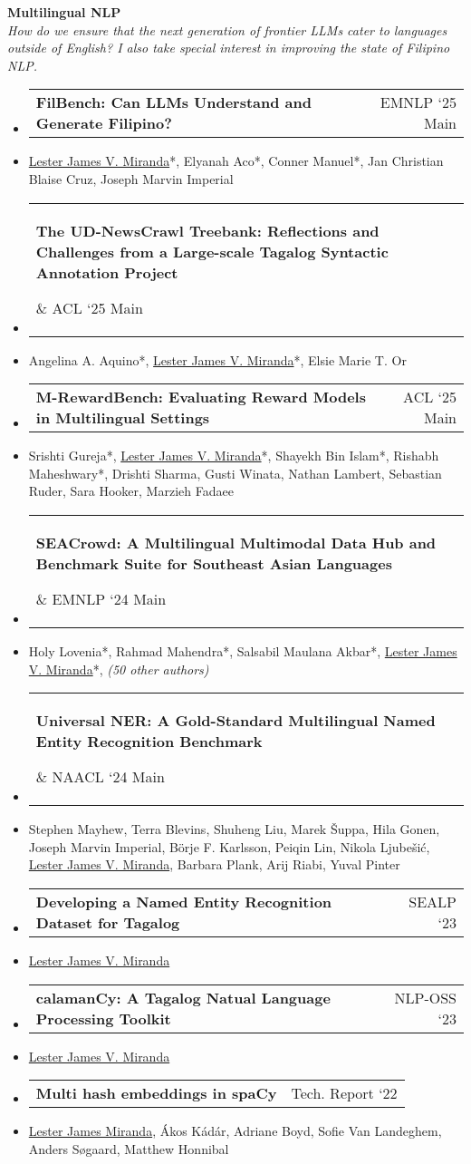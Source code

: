 \documentclass[a4paper,11pt]{article}
\makeatletter
\newcommand{\resumeItem}[1]{
  \item\small{
    {#1 \vspace{-2pt}}
  }
}
\newcommand{\resumeProjectHeading}[2]{
    \item
    \begin{tabular*}{0.97\textwidth}{l@{\extracolsep{\fill}}r}
      \small#1 & #2 \\
    \end{tabular*}\vspace{-7pt}
}
\newcommand{\resumeSubHeadingListStart}{\begin{itemize}[leftmargin=0.15in, label={}]}
\newcommand{\resumeSubHeadingListEnd}{\end{itemize}}
\makeatother
\begin{document}
\vspace{0.1em}
\textbf{Multilingual NLP}\\
\textit{How do we ensure that the next generation of frontier LLMs cater to languages outside of English? I also take special interest in improving the state of Filipino NLP.}
\resumeSubHeadingListStart
\resumeProjectHeading
{\textbf{FilBench: Can LLMs Understand and Generate Filipino?}}{\small EMNLP `25 Main}
\resumeItem{\underline{Lester James V. Miranda}*, Elyanah Aco*, Conner Manuel*, Jan Christian Blaise Cruz, Joseph Marvin Imperial}
\resumeProjectHeading
{\parbox{0.80\textwidth}{\textbf{The UD-NewsCrawl Treebank: Reflections and Challenges from a Large-scale Tagalog Syntactic Annotation Project}}}{\small ACL `25 Main}
\resumeItem{Angelina A. Aquino*, \underline{Lester James V. Miranda}*, Elsie Marie T. Or}
\resumeProjectHeading
{\textbf{M-RewardBench: Evaluating Reward Models in Multilingual Settings}}{\small ACL `25 Main}
\resumeItem{Srishti Gureja*, \underline{Lester James V. Miranda}*, Shayekh Bin Islam*, Rishabh Maheshwary*, Drishti Sharma, Gusti Winata, Nathan Lambert, Sebastian Ruder, Sara Hooker, Marzieh Fadaee}
\resumeProjectHeading
{\parbox{0.80\textwidth}{\textbf{SEACrowd: A Multilingual Multimodal Data Hub and Benchmark Suite for Southeast Asian Languages}}}{\small EMNLP `24 Main}
\resumeItem{Holy Lovenia*, Rahmad Mahendra*, Salsabil Maulana Akbar*, \underline{Lester James V. Miranda}*, \textit{(50 other authors)}}
\resumeProjectHeading
{\parbox{0.70\textwidth}{\textbf{Universal NER: A Gold-Standard Multilingual Named Entity Recognition Benchmark}}}{\small NAACL `24 Main}
\resumeItem{Stephen Mayhew, Terra Blevins, Shuheng Liu, Marek Šuppa, Hila Gonen, Joseph Marvin Imperial, Börje F. Karlsson, Peiqin Lin, Nikola Ljubešić, \underline{Lester James V. Miranda}, Barbara Plank, Arij Riabi, Yuval Pinter}
\resumeProjectHeading
{\textbf{Developing a Named Entity Recognition Dataset for Tagalog}}{\small SEALP `23}
\resumeItem{\underline{Lester James V. Miranda}}
\resumeProjectHeading
{\textbf{calamanCy: A Tagalog Natual Language Processing Toolkit}}{\small NLP-OSS `23}
\resumeItem{\underline{Lester James V. Miranda}}
\resumeProjectHeading
{\textbf{Multi hash embeddings in spaCy}}{\small Tech. Report `22}
\resumeItem{\underline{Lester James Miranda}, Ákos Kádár, Adriane Boyd, Sofie Van Landeghem, Anders Søgaard, Matthew Honnibal}
\resumeSubHeadingListEnd

\end{document}
